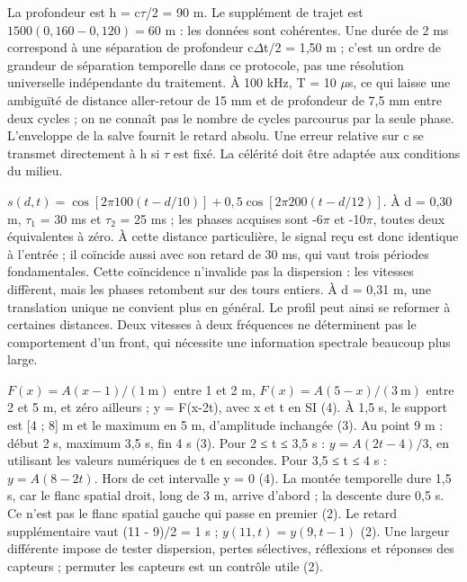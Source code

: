 La profondeur est h = c\ensuremath{\tau}/2 = 90 m. Le supplément de trajet est $1500(0{,}160-0{,}120)=60$ m : les données sont cohérentes. Une durée de 2 ms correspond à une séparation de profondeur c\ensuremath{\Delta}t/2 = 1,50 m ; c’est un ordre de grandeur de séparation temporelle dans ce protocole, pas une résolution universelle indépendante du traitement. À 100 kHz, T = 10 \ensuremath{\mu}s, ce qui laisse une ambiguïté de distance aller-retour de 15 mm et de profondeur de 7,5 mm entre deux cycles ; on ne connaît pas le nombre de cycles parcourus par la seule phase. L’enveloppe de la salve fournit le retard absolu. Une erreur relative sur c se transmet directement à h si \ensuremath{\tau} est fixé. La célérité doit être adaptée aux conditions du milieu.

$s(d,t)=\cos[2\pi100(t-d/10)]+0{,}5\cos[2\pi200(t-d/12)]$. À d = 0,30 m, \ensuremath{\tau_1} = 30 ms et \ensuremath{\tau_2} = 25 ms ; les phases acquises sont -6\ensuremath{\pi} et -10\ensuremath{\pi}, toutes deux équivalentes à zéro. À cette distance particulière, le signal reçu est donc identique à l’entrée ; il coïncide aussi avec son retard de 30 ms, qui vaut trois périodes fondamentales. Cette coïncidence n’invalide pas la dispersion : les vitesses diffèrent, mais les phases retombent sur des tours entiers. À d = 0,31 m, une translation unique ne convient plus en général. Le profil peut ainsi se reformer à certaines distances. Deux vitesses à deux fréquences ne déterminent pas le comportement d’un front, qui nécessite une information spectrale beaucoup plus large.

$F(x)=A(x-1)/(1\ \mathrm m)$ entre 1 et 2 m, $F(x)=A(5-x)/(3\ \mathrm m)$ entre 2 et 5 m, et zéro ailleurs ; y = F(x-2t), avec x et t en SI (4). À 1,5 s, le support est [4 ; 8] m et le maximum en 5 m, d’amplitude inchangée (3).
Au point 9 m : début 2 s, maximum 3,5 s, fin 4 s (3). Pour 2 ≤ t ≤ 3,5 s : $y=A(2t-4)/3$, en utilisant les valeurs numériques de t en secondes. Pour 3,5 ≤ t ≤ 4 s : $y=A(8-2t)$. Hors de cet intervalle y = 0 (4). La montée temporelle dure 1,5 s, car le flanc spatial droit, long de 3 m, arrive d’abord ; la descente dure 0,5 s. Ce n’est pas le flanc spatial gauche qui passe en premier (2).
Le retard supplémentaire vaut (11 - 9)/2 = 1 s ; $y(11,t)=y(9,t-1)$ (2). Une largeur différente impose de tester dispersion, pertes sélectives, réflexions et réponses des capteurs ; permuter les capteurs est un contrôle utile (2).


